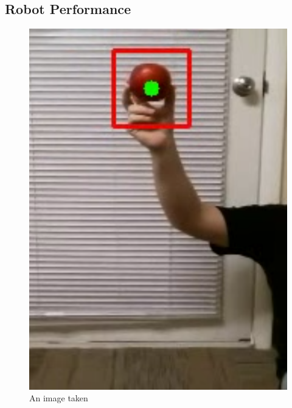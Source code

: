 \subsection{Robot Performance}\label{subsec:robot-performance}
\begin{figure}[!htb]
    \centering
    \includegraphics[width=\columnwidth,keepaspectratio]
    {./figures/haar-cascade-detection}
    \caption{
        An image taken
    }
    \label{fig:drone-haar-cascade}
\end{figure}
